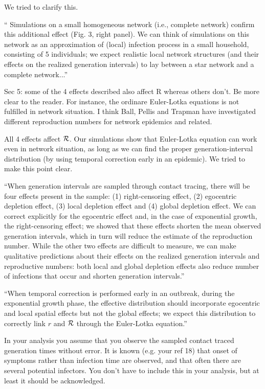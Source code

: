 \documentclass[12pt]{article}
\newcommand{\RR}{\ensuremath{{\cal R}}}
\newcommand{\revtext}{\textsf}
\begin{document}
We tried to clarify this.

``
Simulations on a small homogeneous network (i.e., complete network) confirm this additional effect (Fig. 3, right panel). We can think of simulations on this network as an approximation of (local) infection process in a small household, consisting of 5 individuals;
we expect realistic local network structures (and their effects on the realized generation intervals) to lay between a star network and a complete network...''

\revtext{Sec 5: some of the 4 effects described also affect R whereas others don't. Be more clear to the reader. For instance, the ordinare Euler-Lotka equations is not fulfilled in network situation. I think Ball, Pellis and Trapman have investigated different reproduction numbers for network epidemics and related.}

All 4 effects affect $\RR$. Our simulations show that Euler-Lotka equation can work even in network situation, as long as we can find the proper generation-interval distribution (by using temporal correction early in an epidemic). We tried to make this point clear.

``When generation intervals are sampled through contact tracing, there will be four effects present in the sample: (1) right-censoring effect, (2) egocentric depletion effect, (3) local depletion effect and (4) global depletion effect.
We can correct explicitly for the egocentric effect and, in the case of exponential growth, the right-censoring effect;
we showed that these effects shorten the mean observed generation intervals, which in turn will reduce the estimate of the reproduction number.
While the other two effects are difficult to measure, we can make qualitative predictions about their effects on the realized generation intervals and reproductive numbers: 
both local and global depletion effects also reduce number of infections that occur and shorten generation intervals.''

``When temporal correction is performed early in an outbreak, during the exponential growth phase, the effective distribution should incorporate egocentric and local spatial effects but not the global effects; we expect this distribution to correctly link $r$ and $\RR$ through the Euler-Lotka equation.''

\revtext{In your analysis you assume that you observe the sampled contact traced generation times without error. It is known (e.g. your ref 18) that onset of symptoms rather than infection time are observed, and that often there are several potential infectors. You don't have to include this in your analysis, but at least it should be acknowledged.}
\end{document}
